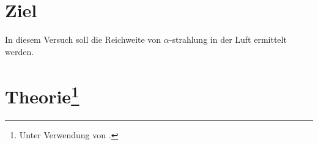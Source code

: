 \section{Ziel}
In diesem Versuch soll die Reichweite von $\alpha$-strahlung in der Luft ermittelt werden.

\section[Theorie]{Theorie\footnote[1]{Unter Verwendung von \cite{man:v701}.}}
